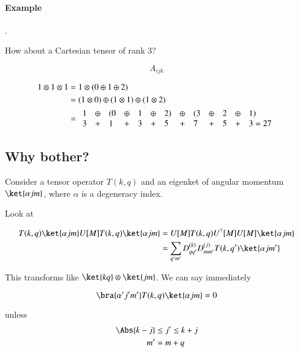 \paragraph{Example}.

How about a Cartesian tensor of rank 3?

\begin{equation}\label{eqn:qmTwoL20:110}
A_{ijk}
\end{equation}

\begin{align*}
1 \otimes 1 \otimes 1  
&=
1 \otimes ( 0 \oplus 1 \oplus 2) \\
&=
(1 \otimes 0) \oplus (1 \otimes 1) \oplus (1 \otimes 2) \\
&=
\begin{array}{l l l l l l l l l l l l l l}
1 &\oplus   &(0 &\oplus &1 &\oplus &2) &\oplus &(3  &\oplus & 2 &\oplus &1) \\
3 &+        &1 &+      &3 &+      &5  &+       &7  &+      & 5 &+      &3 = 27
\end{array}
\end{align*}

\subsection{Why bother?}

Consider a tensor operator $T(k, q)$ and an eigenket of angular momentum $\ket{\alpha j m}$, where $\alpha$ is a degeneracy index.

Look at

\begin{align*}
T(k, q) \ket{\alpha j m}
U[M] T(k, q) \ket{\alpha j m}
&=
U[M] T(k, q) U^\dagger[M] U[M] \ket{\alpha j m} \\
&=
\sum_{q' m'} 
D^{(k)}_{q q'} 
D^{(j)}_{m m'} 
T(k, q') \ket{\alpha j m'} 
\end{align*}

This transforms like $\ket{k q} \otimes \ket{j m}$.  We can say immediately

\begin{equation}\label{eqn:qmTwoL20:150}
\bra{\alpha' j' m'} T(k, q) \ket{\alpha j m} = 0 
\end{equation}

unless 
\begin{align}\label{eqn:qmTwoL20:170}
\Abs{k - j} &\le j' \le k + j \\
m' &= m + q
\end{align}

